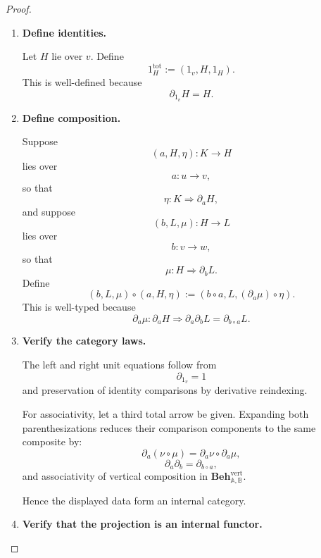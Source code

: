 \begin{proof}
    \leavevmode
    \begin{enumerate}
        \item \textbf{Define identities.}

        Let \(H\) lie over \(v\). Define
        \[
            1_H^{\mathrm{tot}}
            :=
            (1_v,H,1_H).
        \]
        This is well-defined because
        \[
            \partial_{1_v}H=H.
        \]

        \item \textbf{Define composition.}

        Suppose
        \[
            (a,H,\eta):K\to H
        \]
        lies over
        \[
            a:u\to v,
        \]
        so that
        \[
            \eta:K\Rightarrow\partial_aH,
        \]
        and suppose
        \[
            (b,L,\mu):H\to L
        \]
        lies over
        \[
            b:v\to w,
        \]
        so that
        \[
            \mu:H\Rightarrow\partial_bL.
        \]
        Define
        \[
            (b,L,\mu)\circ(a,H,\eta)
            :=
            \left(
                b\circ a,
                L,
                (\partial_a\mu)\circ\eta
            \right).
        \]
        This is well-typed because
        \[
            \partial_a\mu:
            \partial_aH
            \Rightarrow
            \partial_a\partial_bL
            =
            \partial_{b\circ a}L.
        \]

        \item \textbf{Verify the category laws.}

        The left and right unit equations follow from
        \[
            \partial_{1_v}=1
        \]
        and preservation of identity comparisons by derivative
        reindexing.

        For associativity, let a third total arrow be given. Expanding both
        parenthesizations reduces their comparison components to the same
        composite by:
        \[
            \partial_a(\nu\circ\mu)
            =
            \partial_a\nu\circ\partial_a\mu,
        \]
        \[
            \partial_a\partial_b
            =
            \partial_{b\circ a},
        \]
        and associativity of vertical composition in
        \(\mathbf{Beh}^{\mathrm{vert}}_{\mathbb A,\mathbb B}\).

        Hence the displayed data form an internal category.

        \item \textbf{Verify that the projection is an internal functor.}


\end{enumerate}
\end{proof}
